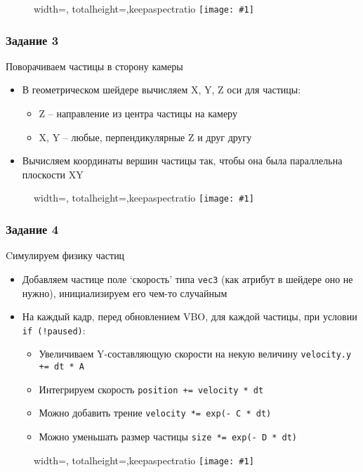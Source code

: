 \documentclass{beamer}
\newcommand{\slideimage}[1]{
  \begin{figure}
    \begin{adjustbox}{width=\textwidth, totalheight=\textheight-2\baselineskip-2\baselineskip,keepaspectratio}
      \texttt{[image: \#1]}
    \end{adjustbox}
  \end{figure}
}
\begin{document}
\begin{frame}[fragile]
\slideimage{2.png}
\end{frame}

\begin{frame}[fragile]
\frametitle{Задание 3}
Поворачиваем частицы в сторону камеры
\begin{itemize}
\item В геометрическом шейдере вычисляем X, Y, Z оси для частицы:
\begin{itemize}
\item Z -- направление из центра частицы на камеру
\item X, Y -- любые, перпендикулярные Z и друг другу
\end{itemize}
\item Вычисляем координаты вершин частицы так, чтобы она была параллельна плоскости XY
\end{itemize}
\end{frame}

\begin{frame}[fragile]
\slideimage{3.png}
\end{frame}

\begin{frame}[fragile]
\frametitle{Задание 4}
Cимулируем физику частиц
\begin{itemize}
\item Добавляем частице поле `скорость' типа \verb|vec3| (как атрибут в шейдере оно не нужно), инициализируем его чем-то случайным
\item На каждый кадр, перед обновлением VBO, для каждой частицы, при условии \verb|if (!paused)|:
\begin{itemize}
\item Увеличиваем Y-составляющую скорости на некую величину \verb|velocity.y += dt * A|
\item Интегрируем скорость \verb|position += velocity * dt|
\item Можно добавить трение \verb|velocity *= exp(- C * dt)|
\item Можно уменьшать размер частицы \verb|size *= exp(- D * dt)|
\end{itemize}
\end{itemize}
\end{frame}

\begin{frame}[fragile]
\slideimage{4.png}
\end{frame}
\end{document}
